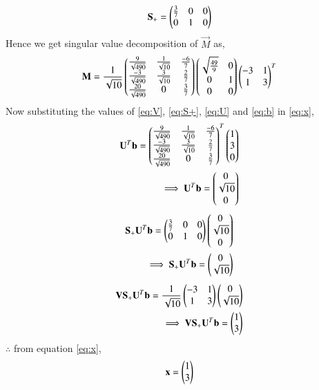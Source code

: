 \documentclass[journal,12pt,twocolumn]{IEEEtran}
\begin{document}
\begin{align}
\mathbf{S}_+ = \begin{pmatrix}\frac{3}{7}&0&0\\0&1&0\end{pmatrix}\label{eq:S+}
\end{align}
Hence we get singular value decomposition of $\vec{M}$ as,
\begin{align}
\mathbf{M} = \frac{1}{\sqrt{10}}\begin{pmatrix}\frac{9}{\sqrt{490}} &\frac{1}{\sqrt{10}} & \frac{-6}{7}\\\frac{-3}{\sqrt{490}} &\frac{3}{\sqrt{10}} &\frac{2}{7} \\\frac{20}{\sqrt{490}}&0& \frac{3}{7}\end{pmatrix}\begin{pmatrix}\sqrt{\frac{49}{9}}&0\\0&1\\0&0\end{pmatrix}\begin{pmatrix}-3&1\\1&3\end{pmatrix}^T
\end{align}
Now substituting the values of \eqref{eq:V}, \eqref{eq:S+}, \eqref{eq:U} and \eqref{eq:b} in \eqref{eq:x},
\begin{align}
\mathbf{U}^T\mathbf{b} =
\begin{pmatrix}\frac{9}{\sqrt{490}} &\frac{1}{\sqrt{10}} & \frac{-6}{7}\\\frac{-3}{\sqrt{490}} &\frac{3}{\sqrt{10}} &\frac{2}{7} \\\frac{20}{\sqrt{490}}&0& \frac{3}{7}\end{pmatrix}^T
\begin{pmatrix}1\\3\\0\end{pmatrix}\\
\implies \mathbf{U}^T\mathbf{b} = \begin{pmatrix}0\\\sqrt{10}\\0\end{pmatrix}\label{eq:Utb}
\end{align}
\begin{align}
\mathbf{S}_+\mathbf{U}^T\mathbf{b} = \begin{pmatrix}\frac{3}{7}&0&0\\0&1&0\end{pmatrix}\begin{pmatrix}0\\ \sqrt{10}\\0\end{pmatrix}\\
\implies \mathbf{S}_+\mathbf{U}^T\mathbf{b} = \begin{pmatrix}0\\ \sqrt{10}\end{pmatrix}\label{eq:SUtb}
\end{align}
\begin{align}
\mathbf{V}\mathbf{S}_+\mathbf{U}^T\mathbf{b} = \frac{1}{\sqrt{10}}\begin{pmatrix}-3&1\\1&3\end{pmatrix}\begin{pmatrix}0\\ \sqrt{10}\end{pmatrix}\\
\implies \mathbf{V}\mathbf{S}_+\mathbf{U}^T\mathbf{b} = \begin{pmatrix}1\\3\end{pmatrix}
\end{align}
$\therefore$ from equation \eqref{eq:x},
\begin{align}
\mathbf{x} = \begin{pmatrix}1 \\ 3 \end{pmatrix} \label{eq:x_svd}
\end{align}
\end{document}
